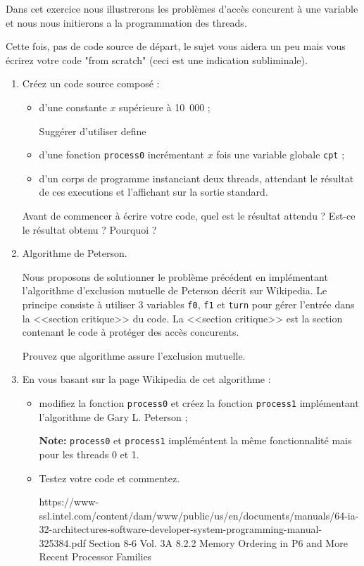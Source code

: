 \documentclass[11pt]{article}
\begin{document}
Dans cet exercice nous illustrerons les problèmes d'accès concurent à une variable et nous nous initierons a la programmation des threads.

Cette fois, pas de code source de départ, le sujet vous aidera un peu mais vous écrirez votre code "from scratch" (ceci est une indication subliminale).

\begin{enumerate}
 \item Créez un code source composé :
 \begin{itemize}
  \item d'une constante $x$ supérieure à 10~000 ;
\begin{solution}
 Suggérer d'utiliser define
\end{solution}
  \item d'une fonction \texttt{process0} incrémentant $x$ fois une variable globale \texttt{cpt} ;
  \item d'un corps de programme instanciant deux threads, attendant le résultat de ces executions et l'affichant sur la sortie standard.
 \end{itemize}
 Avant de commencer à écrire votre code, quel est le résultat attendu ? Est-ce le résultat obtenu ? Pourquoi ?

 \item Algorithme de Peterson.

 Nous proposons de solutionner le problème précédent en implémentant l'algorithme d'exclusion mutuelle de Peterson décrit sur Wikipedia.
 Le principe consiste à utiliser 3 variables \texttt{f0}, \texttt{f1} et \texttt{turn} pour gérer l'entrée dans la <<section critique>> du code.
 La <<section critique>> est la section contenant le code à protéger des accès concurents.

 Prouvez que algorithme assure l'exclusion mutuelle.

 \item En vous basant sur la page Wikipedia de cet algorithme :
 \begin{itemize}
  \item modifiez la fonction \texttt{process0} et créez la fonction \texttt{process1} implémentant l'algorithme de Gary L. Peterson ;

\textbf{Note:}  \texttt{process0}  et  \texttt{process1} impléméntent la même fonctionnalité mais pour les threads 0 et 1.
  \item Testez votre code et commentez.
  \begin{solution}
    https://www-ssl.intel.com/content/dam/www/public/us/en/documents/manuals/64-ia-32-architectures-software-developer-system-programming-manual-325384.pdf Section 8-6 Vol. 3A 8.2.2 Memory Ordering in P6 and More Recent Processor Families
  \end{solution}
 \end{itemize}


\end{enumerate}
\end{document}
